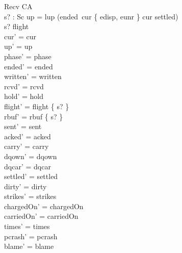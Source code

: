 \documentclass[a4paper,10pt,fleqn]{article}
\begin{document}
\begin{schema}{Recv}
  \Delta CA \\
  s? : Sc
\where
  up = lup \lor (ended~cur \in \{ edisp, eunr \} \land cur \notin settled) \\
  s? \in flight \\
  cur' = cur \\
  up' = up \\
  phase' = phase \\
  ended' = ended \\
  written' = written \\
  rcvd' = rcvd \\
  hold' = hold \\
  flight' = flight \setminus \{ s? \} \\
  rbuf' = rbuf \cup \{ s? \} \\
  sent' = sent \\
  acked' = acked \\
  carry' = carry \\
  dqown' = dqown \\
  dqcar' = dqcar \\
  settled' = settled \\
  dirty' = dirty \\
  strikes' = strikes \\
  chargedOn' = chargedOn \\
  carriedOn' = carriedOn \\
  times' = times \\
  pcrash' = pcrash \\
  blame' = blame
\end{schema}
\end{document}
